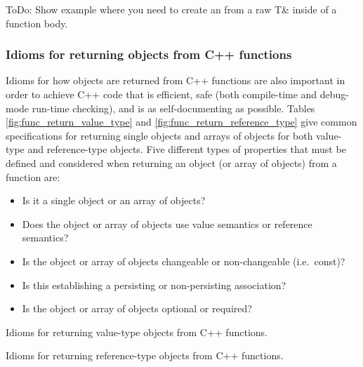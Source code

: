 \documentclass[pdf,ps2pdf,11pt]{SANDreport}
\begin{document}
ToDo: Show example where you need to create an {} from
a raw T\& inside of a function body.


%
{}\subsubsection{Idioms for returning objects from C++ functions}
\label{sec:idioms-returning-objects}
%

Idioms for how objects are returned from C++ functions are also
important in order to achieve C++ code that is efficient, safe (both
compile-time and debug-mode run-time checking), and is as
self-documenting as possible.  Tables
{}\ref{fig:func_return_value_type} and
{}\ref{fig:func_return_reference_type} give common specifications for
returning single objects and arrays of objects for both value-type and
reference-type objects.  Five different types of properties that must
be defined and considered when returning an object (or array of
objects) from a function are:

\begin{itemize}

{}\item Is it a single object or an array of objects?

{}\item Does the object or array of objects use value semantics or
reference semantics?

{}\item Is the object or array of objects changeable or non-changeable
(i.e.\ const)?

{}\item Is this establishing a persisting or non-persisting
association?

{}\item Is the object or array of objects optional or required?

\end{itemize}


\begin{table}[p]
%
\begin{center}
%
%

%
%
%
\end{center}
\caption{\label{fig:func_return_value_type}
Idioms for returning value-type objects from C++ functions.}
%
\end{table}


\begin{table}[p]
%
\begin{center}
%
%

%
%
%
\end{center}
\caption{\label{fig:func_return_reference_type}
Idioms for returning reference-type objects from C++ functions.}
%
\end{table}
\end{document}
